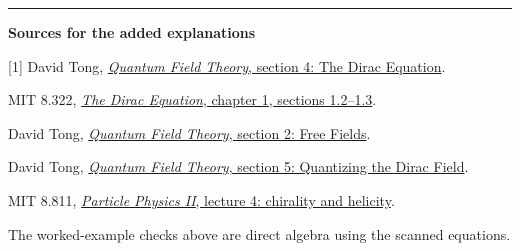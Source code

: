 \documentclass[11pt,a4paper]{article}
\begin{document}
\vspace{4pt}\hrule\vspace{5pt}
{\small\textbf{Sources for the added explanations}\par
\footnotesize
[1] David Tong, \href{https://www.damtp.cam.ac.uk/user/tong/qft/qfthtml/S4.html}{\emph{Quantum Field Theory}, section 4: The Dirac Equation}.\par
[2] MIT 8.322, \href{https://web.mit.edu/8.322/Spring%202007/notes/chapter1.pdf}{\emph{The Dirac Equation}, chapter 1, sections 1.2--1.3}.\par
[3] David Tong, \href{https://www.damtp.cam.ac.uk/user/tong/qft/qfthtml/S2.html}{\emph{Quantum Field Theory}, section 2: Free Fields}.\par
[4] David Tong, \href{https://www.damtp.cam.ac.uk/user/tong/qft/qfthtml/S5.html}{\emph{Quantum Field Theory}, section 5: Quantizing the Dirac Field}.\par
[5] MIT 8.811, \href{https://ocw.mit.edu/courses/8-811-particle-physics-ii-fall-2005/resources/lec4/}{\emph{Particle Physics II}, lecture 4: chirality and helicity}.\par
The worked-example checks above are direct algebra using the scanned equations.}
\end{document}
